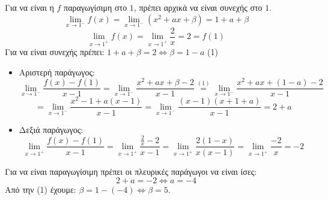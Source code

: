 
\lysh
Για να είναι η $f$ παραγωγίσιμη στο $1$, πρέπει αρχικά να είναι συνεχής στο $1$.
    \[ \lim\limits_{x\to 1^-} f(x) = \lim\limits_{x\to 1^-} (x^2+ax+\beta) = 1+a+\beta \]
    \[ \lim\limits_{x\to 1^+} f(x) = \lim\limits_{x\to 1^+} \frac{2}{x} = 2 = f(1) \]
    Για να είναι συνεχής πρέπει: $1+a+\beta = 2 \Leftrightarrow \beta = 1-a$ \quad (1)
    \begin{itemize}
        \item Αριστερή παράγωγος: 
        \[ \lim\limits_{x\to 1^-} \frac{f(x)-f(1)}{x-1} = \lim\limits_{x\to 1^-} \frac{x^2+ax+\beta-2}{x-1} \stackrel{(1)}{=} \lim\limits_{x\to 1^-} \frac{x^2+ax+(1-a)-2}{x-1} \]
        \[ = \lim\limits_{x\to 1^-} \frac{x^2-1 + a(x-1)}{x-1} = \lim\limits_{x\to 1^-} \frac{(x-1)(x+1+a)}{x-1} = 2+a \]
        \item Δεξιά παράγωγος:
        \[ \lim\limits_{x\to 1^+} \frac{f(x)-f(1)}{x-1} = \lim\limits_{x\to 1^+} \frac{\frac{2}{x}-2}{x-1} = \lim\limits_{x\to 1^+} \frac{2(1-x)}{x(x-1)} = \lim\limits_{x\to 1^+} \frac{-2}{x} = -2 \]
    \end{itemize}
    Για να είναι παραγωγίσιμη πρέπει οι πλευρικές παράγωγοι να είναι ίσες:
    \[ 2+a = -2 \Leftrightarrow {a = -4} \]
    Από την (1) έχουμε: $\beta = 1 - (-4) \Leftrightarrow {\beta = 5}$.\\


